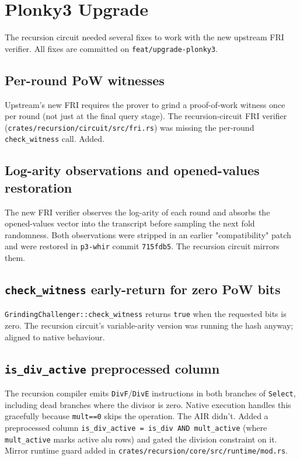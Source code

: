 \section{Plonky3 Upgrade}
\label{sec:plonky3-upgrade}

The recursion circuit needed several fixes to work with the new
upstream FRI verifier.  All fixes are committed on
\texttt{feat/upgrade-plonky3}.

\subsection{Per-round PoW witnesses}

Upstream's new FRI requires the prover to grind a proof-of-work
witness once per round (not just at the final query stage).  The
recursion-circuit FRI verifier
(\texttt{crates/recursion/circuit/src/fri.rs}) was missing the
per-round \texttt{check\_witness} call.  Added.

\subsection{Log-arity observations and opened-values restoration}

The new FRI verifier observes the log-arity of each round and absorbs
the opened-values vector into the transcript before sampling the next
fold randomness.  Both observations were stripped in an earlier
"compatibility" patch and were restored in
\texttt{p3-whir} commit \texttt{715fdb5}.  The recursion circuit
mirrors them.

\subsection{\texttt{check\_witness} early-return for zero PoW bits}

\texttt{GrindingChallenger::check\_witness} returns \texttt{true} when
the requested bits is zero.  The recursion circuit's variable-arity
version was running the hash anyway; aligned to native behaviour.

\subsection{\texttt{is\_div\_active} preprocessed column}

The recursion compiler emits \texttt{DivF}/\texttt{DivE} instructions
in both branches of \texttt{Select}, including dead branches where the
divisor is zero.  Native execution handles this gracefully because
\texttt{mult==0} skips the operation.  The AIR didn't.  Added a
preprocessed column \texttt{is\_div\_active = is\_div AND
mult\_active} (where \texttt{mult\_active} marks active alu rows) and
gated the division constraint on it.  Mirror runtime guard added in
\texttt{crates/recursion/core/src/runtime/mod.rs}.

